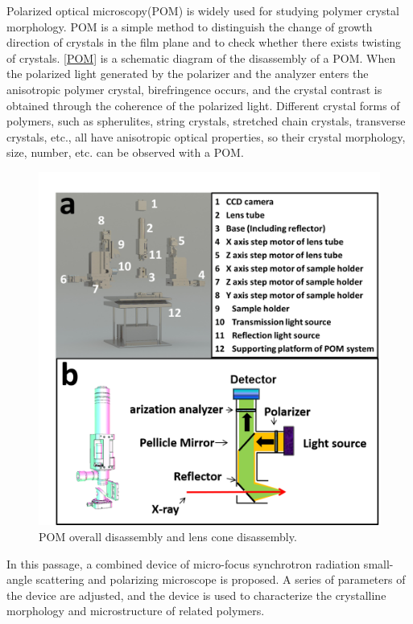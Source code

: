 \documentclass{Head}
\begin{document}
Polarized optical microscopy(POM) is widely used for studying polymer crystal morphology.
POM is a simple method to distinguish the change of growth direction of crystals in the film plane and to check whether there exists twisting of crystals\cite{RN37}.
\autoref{POM} is a schematic diagram of the disassembly of a POM.
When the polarized light generated by the polarizer and the analyzer enters the anisotropic polymer crystal, birefringence occurs, and the crystal contrast is obtained through the coherence of the polarized light.
Different crystal forms of polymers, such as spherulites, string crystals, stretched chain crystals, transverse crystals, etc., all have anisotropic optical properties, so their crystal morphology, size, number, etc. can be observed with a POM.
\begin{figure}
    \centering
    \includegraphics[scale=0.4]{Figures/Fig3POM.png}
    \caption{POM overall disassembly and lens cone disassembly.}
    \label{POM}
\end{figure}


In this passage, a combined device of micro-focus synchrotron radiation small-angle scattering and polarizing microscope is proposed.
A series of parameters of the device are adjusted, and the device is used to characterize the crystalline morphology and microstructure of related polymers.
\end{document}
